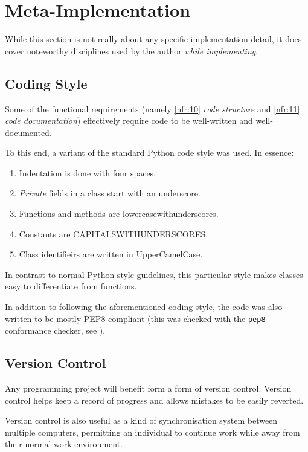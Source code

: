 \documentclass[10pt,a4paper,notitlepage]{report}
\begin{document}
\section{Meta-Implementation}
While this section is not really about any specific implementation detail, it does cover noteworthy disciplines used by the author \emph{while implementing}.

\subsection{Coding Style}
Some of the functional requirements (namely \ref{nfr:10} \emph{code structure} and \ref{nfr:11} \emph{code documentation}) effectively require code to be well-written and well-documented.

To this end, a variant of the standard Python code style was used. In essence:
\begin{enumerate}[label=\roman*)]
\item Indentation is done with four spaces.\\
\item \emph{Private} fields in a class start with an underscore.\\
\item Functions and methods are lower\textunderscore{}case\textunderscore{}with\textunderscore{}underscores.\\
\item Constants are CAPITALS\textunderscore{}WITH\textunderscore{}UNDERSCORES.\\
\item Class identifieirs are written in UpperCamelCase.
\end{enumerate}

In contrast to normal Python style guidelines, this particular style makes classes easy to differentiate from functions.

In addition to following the aforementioned coding style, the code was also written to be mostly PEP8\cite{pep8} compliant (this was checked with the \texttt{pep8} conformance checker, see \cite{pep8chk}).

\subsection{Version Control}
Any programming project will benefit form a form of version control. Version control helps keep a record of progress and allows mistakes to be easily reverted.

Version control is also useful as a kind of synchronisation system between multiple computers, permitting an individual to continue work while away from their normal work environment.
\end{document}
